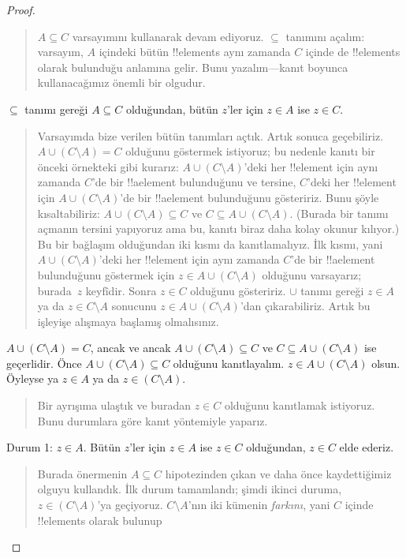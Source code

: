 \begin{proof}
\begin{quote}
    $A \subseteq C$ varsayımını kullanarak devam ediyoruz. $\subseteq$
    tanımını açalım: varsayım, $A$ içindeki bütün !!{element}s aynı zamanda
    $C$ içinde de !!{element}s olarak bulunduğu anlamına gelir. Bunu yazalım---kanıt
    boyunca kullanacağımız önemli bir olgudur.
  \end{quote}
  $\subseteq$ tanımı gereği $A \subseteq C$ olduğundan, bütün $z$'ler
  için $z \in A$ ise $z \in C$.
  \begin{quote}
    Varsayımda bize verilen bütün tanımları açtık. Artık sonuca
    geçebiliriz. $A \cup (C \setminus A) = C$ olduğunu göstermek
    istiyoruz; bu nedenle kanıtı bir önceki örnekteki gibi kurarız: $A
    \cup (C \setminus A)$'deki her !!{element} için aynı zamanda $C$'de
    bir !!a{element} bulunduğunu ve tersine, $C$'deki her !!{element} için
    $A \cup (C \setminus A)$'de bir !!a{element} bulunduğunu gösteririz.
    Bunu şöyle kısaltabiliriz: $A \cup (C \setminus A) \subseteq C$ ve
    $C \subseteq A \cup (C \setminus A)$. (Burada bir tanımı açmanın
    tersini yapıyoruz ama bu, kanıtı biraz daha kolay okunur kılıyor.)
    Bu bir bağlaşım olduğundan iki kısmı da kanıtlamalıyız. İlk kısmı,
    yani $A \cup (C \setminus A)$'deki her !!{element} için aynı zamanda
    $C$'de bir !!a{element} bulunduğunu göstermek için $z \in A \cup (C
    \setminus A)$ olduğunu varsayarız; burada~$z$ keyfîdir. Sonra $z \in C$ olduğunu
    gösteririz. $\cup$ tanımı gereği $z \in A$ ya da $z \in C \setminus A$
    sonucunu $z \in A \cup (C \setminus A)$'dan çıkarabiliriz. Artık
    bu işleyişe alışmaya başlamış olmalısınız.
    \end{quote}
  $A \cup (C \setminus A) = C$, ancak ve ancak $A \cup (C \setminus A)
  \subseteq C$ ve $C \subseteq A \cup (C \setminus A)$ ise geçerlidir.
  Önce $A \cup (C \setminus A) \subseteq C$ olduğunu kanıtlayalım. $z
  \in A \cup (C \setminus A)$ olsun. Öyleyse ya $z \in A$ ya da $z \in
  (C \setminus A)$.
  \begin{quote}
    Bir ayrışıma ulaştık ve buradan $z \in C$ olduğunu kanıtlamak
    istiyoruz. Bunu durumlara göre kanıt yöntemiyle yaparız.
  \end{quote}
  Durum 1: $z \in A$. Bütün $z$'ler için $z \in A$ ise $z \in C$
  olduğundan, $z \in C$ elde ederiz.
  \begin{quote}
    Burada önermenin $A \subseteq C$ hipotezinden çıkan ve daha önce
    kaydettiğimiz olguyu kullandık. İlk durum tamamlandı; şimdi ikinci
    duruma, $z \in (C \setminus A)$'ya geçiyoruz. $C \setminus A$'nın
    iki kümenin \emph{farkını}, yani $C$ içinde !!{element}s olarak bulunup

\end{quote}
\end{proof}
